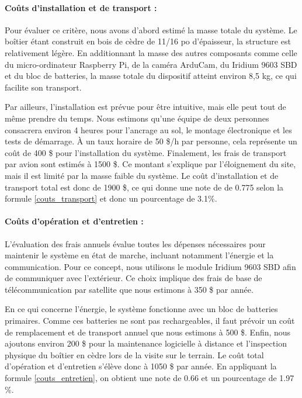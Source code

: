 \paragraph{Coûts d'installation et de transport :}
Pour évaluer ce critère, nous avons d'abord estimé la masse totale du système.
Le boîtier étant construit en bois de cèdre de 11/16 po d'épaisseur, la structure est relativement légère.
En additionnant la masse des autres composants comme celle du micro-ordinateur Raspberry Pi, de la caméra ArduCam, du Iridium 9603 SBD et du bloc de batteries, la masse totale du dispositif atteint environ 8,5 kg, ce qui facilite son transport.

\bigskip
Par ailleurs, l’installation est prévue pour être intuitive, mais elle peut tout de même prendre du temps. Nous estimons qu'une équipe de deux personnes consacrera environ 4 heures pour l'ancrage au sol, le montage électronique et les tests de démarrage. À un taux horaire de 50 \$/h par personne, cela représente un coût de 400 \$ pour l’installation du système.
Finalement, les frais de transport par avion sont estimés à 1500 \$. Ce montant s'explique par l'éloignement du site, mais il est limité par la masse faible du système. 
Le coût d’installation et de transport total est donc de 1900 \$, ce qui donne une note de de 0.775 selon la formule \ref{couts_transport} et donc un pourcentage de 3.1\%.


\paragraph{Coûts d'opération et d'entretien :}
L’évaluation des frais annuels évalue toutes les dépenses nécessaires pour maintenir le système en état de marche, incluant notamment l'énergie et la communication. 
Pour ce concept, nous utilisons le module Iridium 9603 SBD afin de communiquer avec l’extérieur.
Ce choix implique des frais de base de télécommunication par satellite que nous estimons à 350 \$ par année. 

\bigskip
En ce qui concerne l'énergie, le système fonctionne avec un bloc de batteries primaires.
Comme ces batteries ne sont pas rechargeables, il faut prévoir un coût de remplacement et de transport annuel que nous estimons à 500 \$.
Enfin, nous ajoutons environ 200 \$ pour la maintenance logicielle à distance et l'inspection physique du boîtier en cèdre lors de la visite sur le terrain.
Le coût total d'opération et d'entretien s’élève donc à 1050 \$ par année. En appliquant la formule \ref{couts_entretien}, on obtient une note de 0.66 et un pourcentage de 1.97 \%.


